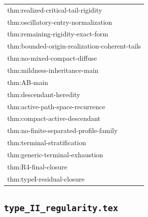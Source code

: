 \documentclass[11pt]{amsart}
\begin{document}
\begin{longtable}{@{}>{\ttfamily\footnotesize\raggedright\arraybackslash}p{}@{}}
thm:realized-critical-tail-rigidity\\
thm:oscillatory-entry-normalization\\
thm:remaining-rigidity-exact-form\\
thm:bounded-origin-realization-coherent-tails\\
thm:no-mixed-compact-diffuse\\
thm:mildness-inheritance-main\\
thm:AB-main\\
thm:descendant-heredity\\
thm:active-path-space-recurrence\\
thm:compact-active-descendant\\
thm:no-finite-separated-profile-family\\
thm:terminal-stratification\\
thm:generic-terminal-exhaustion\\
thm:R4-final-closure\\
thm:typeI-residual-closure\\
\bottomrule
\end{longtable}

\subsection{\texorpdfstring{\texttt{type\_II\_regularity.tex}}{type II regularity.tex}}
\end{document}

